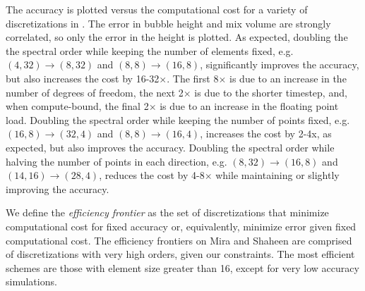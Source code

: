 The accuracy is plotted versus the computational cost for a variety of discretizations in .
The error in bubble height and mix volume are strongly correlated, so only the error in the height is plotted.
As expected, doubling the the spectral order while keeping the number of elements fixed, e.g. $(4,32) \rightarrow (8,32)$ and $(8,8) \rightarrow (16,8)$, significantly improves the accuracy, but also increases the cost by 16-32$\times$.
The first 8$\times$ is due to an increase in the number of degrees of freedom, the next 2$\times$ is due to the shorter timestep, and, when compute-bound, the final 2$\times$ is due to an increase in the floating point load.
Doubling the spectral order while keeping the number of points fixed, e.g. $(16, 8) \rightarrow (32,4)$  and $(8,8) \rightarrow (16,4)$, increases the cost by 2-4x, as expected, but also improves the accuracy.
Doubling the spectral order while halving the number of points in each direction, e.g. $(8,32) \rightarrow (16,8)$ and $(14, 16) \rightarrow (28, 4)$, reduces the cost by 4-8$\times$ while maintaining or slightly improving the accuracy.

We define the \emph{efficiency frontier} as the set of discretizations that minimize computational cost for fixed accuracy or, equivalently, minimize error given fixed computational cost.
The efficiency frontiers on Mira and Shaheen are comprised of discretizations with very high orders, given our constraints.
The most efficient schemes are those with element size greater than 16, except for very low accuracy simulations.


